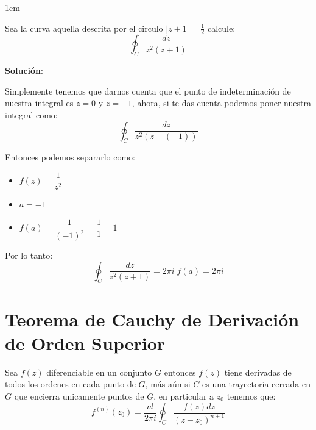 \documentclass[12pt, fleqn]{report}                             %
\newenvironment{SmallIndentation}[1][0.75em]                    %
        {\begin{adjustwidth}{#1}{}\begin{footnotesize}}             %
        {\end{footnotesize}\end{adjustwidth}}                       %
\theoremstyle{break}                                            %
\begin{document}
                \begin{SmallIndentation}[1em]

                    Sea la curva aquella descrita por el circulo $|z+1|=\frac{1}{2}$
                    calcule:
                    \begin{equation*}
                        \oint_C \dfrac{dz}{z^2(z+1)}
                    \end{equation*}

                    \textbf{Solución}:

                    Simplemente tenemos que darnos cuenta que el punto de indeterminación de
                    nuestra integral es $z=0$ y $z=-1$, ahora, si te das cuenta podemos poner
                    nuestra integral como:
                    \begin{equation*}
                        \oint_C \dfrac{dz}{z^2(z- (-1))}
                    \end{equation*}

                    Entonces podemos separarlo como:
                    \begin{itemize}
                        \item $f(z) = \dfrac{1}{z^2}$
                        \item $a = -1$
                        \item $f(a) = \dfrac{1}{(-1)^2} = \dfrac{1}{1} = 1$
                    \end{itemize}

                    Por lo tanto:
                    \begin{equation*}
                        \oint_C \dfrac{dz}{z^2(z+1)} = 2 \pi i \; f(a) = 2 \pi i
                    \end{equation*}

                \end{SmallIndentation}





        \clearpage
        \section{Teorema de Cauchy de Derivación de Orden Superior}

            Sea $f(z)$ diferenciable en un conjunto $G$ entonces $f(z)$ tiene derivadas de todos
            los ordenes en cada punto de $G$, más aún si $C$ es una trayectoria cerrada en $G$
            que encierra unicamente puntos de $G$, en particular a $z_0$ tenemos que:
            \begin{equation*}
                f^{(n)}(z_0) = \dfrac{n!}{2 \pi i} \oint_C \dfrac{f(z) dz}{(z-z_0)^{n+1}}
            \end{equation*}
\end{document}
